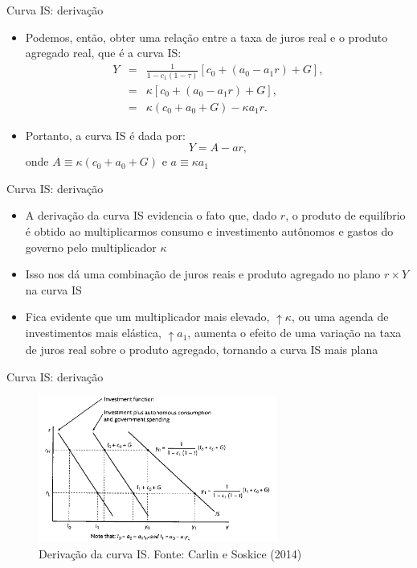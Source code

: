 \documentclass[10pt]{beamer}
\begin{document}
\begin{frame}{Curva IS: derivação}
    \begin{itemize}
        \item Podemos, então, obter uma relação entre a taxa de juros real e o produto agregado real, que é a curva IS:
        \begin{eqnarray}
            Y &=& \frac{1}{1-c_1(1-\tau)}[c_0 + (a_0 - a_1r) + G], \label{aula6_eq3} \\
            &=& \kappa [c_0 + (a_0 - a_1r) + G], \nonumber \\
            &=& \kappa(c_0 + a_0 + G) - \kappa a_1 r. \nonumber
        \end{eqnarray}        
        
        \item Portanto, a curva IS é dada por:
        \begin{equation}
            Y = A - ar, \label{aula6_eq4}
        \end{equation}
        onde $A \equiv \kappa(c_0 + a_0 + G)$ e $a \equiv \kappa a_1$
    \end{itemize}
\end{frame}

\begin{frame}{Curva IS: derivação}
    \begin{itemize}
        \item A derivação da curva IS evidencia o fato que, dado $r$, o produto de equilíbrio é obtido ao multiplicarmos consumo e investimento autônomos e gastos do governo pelo multiplicador $\kappa$\bigskip

        \item Isso nos dá uma combinação de juros reais e produto agregado no plano $r \times Y$ na curva IS\bigskip

        \item Fica evidente que um multiplicador mais elevado, $\uparrow\kappa$, ou uma agenda de investimentos mais elástica, $\uparrow a_1$, aumenta o efeito de uma variação na taxa de juros real sobre o produto agregado, tornando a curva IS mais plana
    \end{itemize}
\end{frame}

\begin{frame}{Curva IS: derivação}
    \begin{figure}
        \centering
        \includegraphics[width=0.7\textwidth]{./figures/aula6_fig6.PNG}
        \caption{Derivação da curva IS. Fonte: Carlin e Soskice (2014)}
        \label{aula6_fig6}
    \end{figure}
\end{frame}
\end{document}
